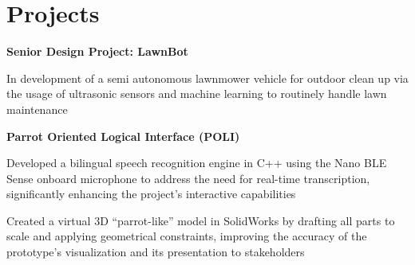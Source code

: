 \section{Projects}
    

    \vspace{0.2 cm}

    \begin{twocolentry}{}
        \textbf{Senior Design Project: LawnBot}
    \end{twocolentry}

    \vspace{0.10 cm}
    \begin{onecolentry}
        \begin{highlights}
            \item In development of a semi autonomous lawnmower vehicle for outdoor clean up via the usage of ultrasonic sensors and machine learning to routinely handle lawn maintenance
        \end{highlights}
    \end{onecolentry}
    
    \vspace{0.2 cm}

    \begin{twocolentry}{}
        \textbf{Parrot Oriented Logical Interface (POLI)}
    \end{twocolentry}

    \vspace{0.10 cm}
    \begin{onecolentry}
        \begin{highlights}
            \item Developed a bilingual speech recognition engine in C++ using the Nano BLE Sense onboard microphone to address the need for real-time transcription, significantly enhancing the project’s interactive capabilities
            \item Created a virtual 3D “parrot-like” model in SolidWorks by drafting all parts to scale and applying geometrical constraints, improving the accuracy of the prototype’s visualization and its presentation to stakeholders
        \end{highlights}
    \end{onecolentry}

